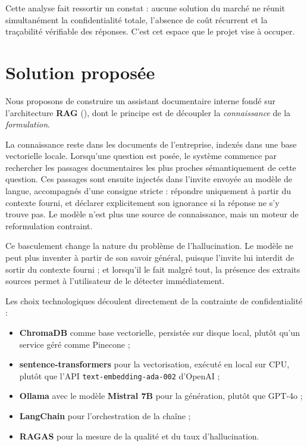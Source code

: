 Cette analyse fait ressortir un constat : aucune solution du marché ne réunit
simultanément la confidentialité totale, l'absence de coût récurrent et la
traçabilité vérifiable des réponses. C'est cet espace que le projet vise à
occuper.

\section{Solution proposée}

Nous proposons de construire un assistant documentaire interne fondé sur
l'architecture \textbf{RAG} (), dont le
principe est de découpler la \emph{connaissance} de la \emph{formulation}.

La connaissance reste dans les documents de l'entreprise, indexés dans une base
vectorielle locale. Lorsqu'une question est posée, le système commence par
rechercher les passages documentaires les plus proches sémantiquement de cette
question. Ces passages sont ensuite injectés dans l'invite envoyée au modèle de
langue, accompagnés d'une consigne stricte : répondre uniquement à partir du
contexte fourni, et déclarer explicitement son ignorance si la réponse ne s'y
trouve pas. Le modèle n'est plus une source de connaissance, mais un moteur de
reformulation contraint.

Ce basculement change la nature du problème de l'hallucination. Le modèle ne
peut plus inventer à partir de son savoir général, puisque l'invite lui interdit
de sortir du contexte fourni ; et lorsqu'il le fait malgré tout, la présence des
extraits sources permet à l'utilisateur de le détecter immédiatement.

Les choix technologiques découlent directement de la contrainte de
confidentialité :

\begin{itemize}
  \item \textbf{ChromaDB} comme base vectorielle, persistée sur disque local,
        plutôt qu'un service géré comme Pinecone ;
  \item \textbf{sentence-transformers} pour la vectorisation, exécuté en local
        sur CPU, plutôt que l'API \texttt{text-embedding-ada-002} d'OpenAI ;
  \item \textbf{Ollama} avec le modèle \textbf{Mistral 7B} pour la génération,
        plutôt que GPT-4o ;
  \item \textbf{LangChain} pour l'orchestration de la chaîne ;
  \item \textbf{RAGAS} pour la mesure de la qualité et du taux d'hallucination.
\end{itemize}


